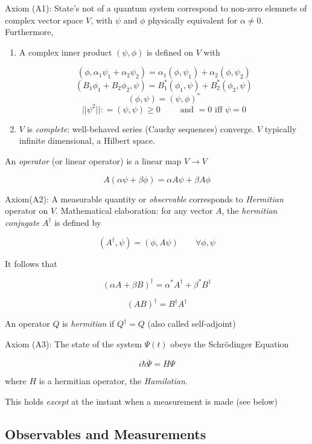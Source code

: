 \documentclass[a4paper]{article}
\begin{document}
Axiom (A1): State's not of a quantum system correspond to non-zero elemnets of complex vector space $ V $, with $ \psi $ and $ \phi $ physically equivalent for $ \alpha \neq 0 $. Furthermore, 
\begin{enumerate}
	\item A complex inner product $ (\psi,\phi) $ is defined on $ V $ with 
	
	\[ (\phi, \alpha_{1} \psi_{1} + \alpha_{2} \psi_{2}) = \alpha_{1} (\phi,\psi_{1}) + \alpha_{2}(\phi,\psi_{2})  \]
	\[ (B_{1}\phi_{1} + B_{2} \phi_{2}, \psi) = B_{1}^{*}(\phi_{1},\psi) + B_{2}^{*} (\phi_{2},\psi) \]
	\[ (\phi,\psi) = (\psi,\phi)^{*} \]
	\[ | | \psi^{2}  | | : = (\psi,\psi) \geq 0 \qquad \text{ and } =0 \text{ iff } \psi = 0 \]
	
	\item $ V $ is \emph{complete}: well-behaved series (Cauchy sequences) converge. $ V $ typically infinite dimensional, a Hilbert space.
	
\end{enumerate}


An \emph{operator} (or linear operator) is a linear map $ V \to V $

\[ A(\alpha \psi + \beta \phi) = \alpha A \psi + \beta A 
\phi \]

Axiom(A2): A measurable quantity or \emph{observable} corresponds to  \emph{Hermitian} operator on $ V $. Mathematical elaboration: for any vector $ A $, the \emph{hermitian conjugate} $ A^{\dag} $ is defined by

\[ (A^{\dag},\psi) = (\phi, A \psi) \qquad \forall \phi, \psi \]

It follows that

\[ (\alpha A + \beta B)^{\dag} = \alpha^{*} A^{\dag} + \beta^{*} B^{
	\dag} \]

\[ (AB)^{\dag} = B^{\dag} A^{\dag} \]

An operator $ Q $ is \emph{hermitian} if $ Q^{\dag} = Q $ (also called self-adjoint)

Axiom (A3): The state of the system $ \Psi(t) $ obeys the Schr\"odinger Equation

\[ i \hbar \dot{\Psi} = H \Psi \]

where $ H $ is a hermitian operator, the \emph{Hamilotian}.

This holds \emph{except} at the instant when a measurement is made (see below)

\subsection{Observables and Measurements}
\end{document}
